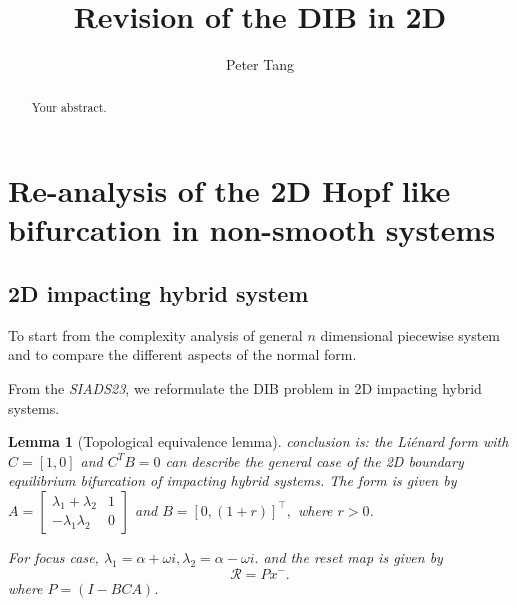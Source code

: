\documentclass{article}
\title{Revision of the DIB in 2D }
\author{Peter Tang}
\newtheorem{lemma}[theorem]{Lemma}
\begin{document}
\maketitle

\begin{abstract}
Your abstract.
\end{abstract}


\section{Re-analysis of the 2D Hopf like bifurcation in non-smooth systems}
\subsection{2D impacting hybrid system}
\label{sec:2D_IHS}

To start from the complexity analysis of general $n$ dimensional piecewise system and to compare the different aspects of the normal form.

From the \emph{SIADS23}, we reformulate the DIB  problem in 2D impacting hybrid systems.

\begin{lemma}[Topological equivalence lemma]
	conclusion is: the Li\'enard form with $C = [1,0]$ and $C^TB = 0$ can describe the general case of the 2D boundary equilibrium bifurcation of impacting hybrid systems.
	The form is given by
	$
	A = \begin{bmatrix}
		\lambda_1 + \lambda_2 & 1 \\
		-\lambda_1 \lambda_2  & 0
		\end{bmatrix}
	$
	and 
	$
	B = [0, (1+r)]^{\top},
	$
where $r>0$.

For focus case,
$
\lambda_1 = \alpha + \omega i, \lambda_2 = \alpha - \omega i.
$
and the reset map is given by 
$$
\mathcal{R} =Px^-.
$$
where 
$ P= (I - BCA)$.

\label{lemma:2D canonical form lemma}
\end{lemma}
\end{document}
